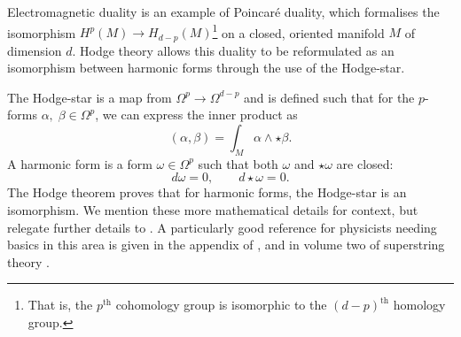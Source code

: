 Electromagnetic duality is an example of Poincar\'e duality, which formalises the isomorphism $H^p(M) \rightarrow H_{d-p}(M)$\footnote{That is, the $p^{\text{th}}$ cohomology group is isomorphic to the $(d-p)^{\text{th}}$ homology group.} on a closed, oriented manifold $M$ of dimension $d$. Hodge theory allows this duality to be reformulated as an isomorphism between harmonic forms through the use of the Hodge-star. 

The Hodge-star is a map from $\Omega^p \rightarrow \Omega^{d-p}$ and is defined such that for the $p$-forms $\alpha, \; \beta \in \Omega^p$, we can express the inner product as
\begin{equation*}
	(\alpha, \beta) = \int_M \alpha \wedge \star \beta.
\end{equation*}
A harmonic form is a form $\omega \in \Omega^p$ such that both $\omega$ and $\star \omega$ are closed:
\begin{equation*}
	d\omega = 0, \qquad d \star \omega = 0.
\end{equation*} 
The Hodge theorem proves that for harmonic forms, the Hodge-star is an isomorphism. We mention these more mathematical details for context, but relegate further details to \cite{Nakahara:206619, Hodge:book}. A particularly good reference for physicists needing basics in this area is given in the appendix of \cite{Becker:2007zj}, and in volume two of superstring theory \cite{Green:1987mn}. 

